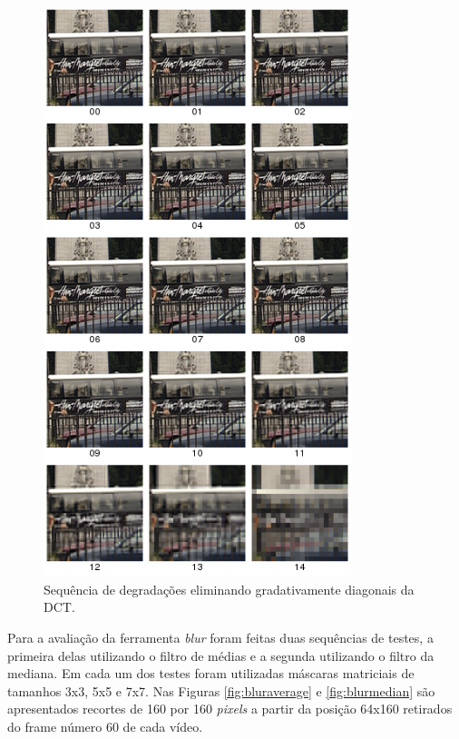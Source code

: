 \begin{figure}[!htb]
	\centering
	\includegraphics[width=0.8\textwidth]{./imgs/blockbus.png}
	\caption{Sequência de degradações eliminando gradativamente diagonais da DCT.}
	\label{fig:blockbus}
\end{figure}

Para a avaliação da ferramenta \emph{blur} foram feitas duas sequências de testes, a primeira delas utilizando o filtro de médias e a segunda utilizando o filtro da mediana.
Em cada um dos testes foram utilizadas máscaras matriciais de tamanhos 3x3, 5x5 e 7x7. Nas Figuras \ref{fig:bluraverage} e \ref{fig:blurmedian} são apresentados recortes de 160 por 160 \emph{pixels} a partir da posição 64x160 retirados do frame número 60 de cada vídeo.

